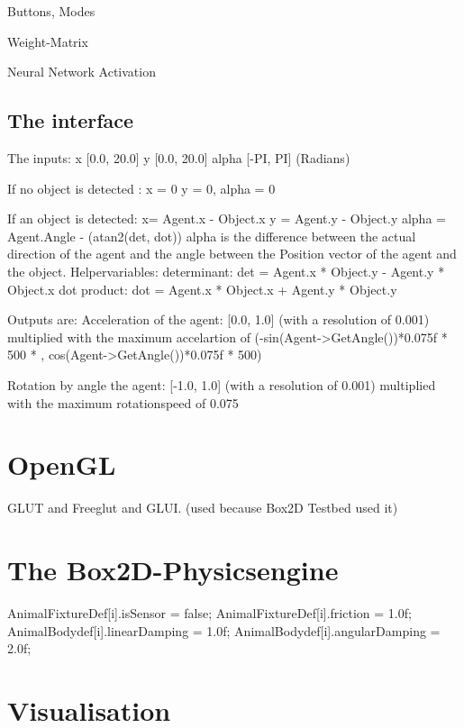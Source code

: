 \documentclass[10pt,a4paper,DIV=11]{scrreprt}
\begin{document}
Buttons, Modes

Weight-Matrix

Neural Network Activation

\subsection{The interface}


The inputs: 
x  [0.0, 20.0]
y   [0.0, 20.0]
alpha  [-PI, PI] (Radians)

If no object is detected :
x = 0
y = 0,
alpha = 0 

If an object is detected:
x= Agent.x - Object.x  
y = Agent.y - Object.y
alpha = Agent.Angle - (atan2(det, dot)) 
alpha is the difference between the actual direction of the agent and
the angle between the Position vector of the agent and the object. 
Helpervariables:
determinant: det =  Agent.x * Object.y - Agent.y * Object.x 
dot product:  dot =  Agent.x * Object.x + Agent.y * Object.y 


Outputs are:
Acceleration of the agent: [0.0, 1.0] (with a resolution of 0.001)
multiplied with the maximum accelartion of 
(-sin(Agent->GetAngle())*0.075f * 500 * ,  cos(Agent->GetAngle())*0.075f * 500)

Rotation by angle the agent: [-1.0, 1.0] (with a resolution of 0.001)
multiplied with the maximum rotationspeed of 0.075



\section{OpenGL}

GLUT and Freeglut and GLUI. (used because Box2D Testbed used it)


\section{The Box2D-Physicsengine}

    AnimalFixtureDef[i].isSensor = false;
    AnimalFixtureDef[i].friction = 1.0f;
    AnimalBodydef[i].linearDamping = 1.0f;
    AnimalBodydef[i].angularDamping = 2.0f;


\section{Visualisation}

\end{document}
